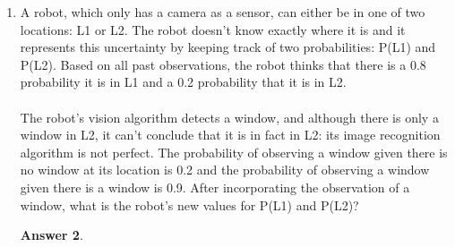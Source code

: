 \documentclass[12pt]{article}
\renewcommand{\(}{\left(}
\renewcommand{\)}{\right)}
\theoremstyle{definition}
\newtheorem*{answer}{Answer}
\begin{document}
\begin{enumerate}
\begin{shaded}
\begin{answer}
    \end{answer}
    \end{shaded}
    \pagebreak
    \textbf{Localization}\\
    In this multi part problem you are going to solve key components for ``Localization'' which is the computer science problem of tracking the location of objects when there is uncertainty.\\
    \item A robot, which only has a camera as a sensor, can either be in one of two locations: L1 or L2. The robot doesn't know exactly where it is and it represents this uncertainty by keeping track of two probabilities: P(L1) and P(L2). Based on all past observations, the robot thinks that there is a 0.8 probability it is in L1 and a 0.2 probability that it is in L2.\\ \\
    The robot's vision algorithm detects a window, and although there is only a window in L2, it can't conclude that it is in fact in L2: its image recognition algorithm is not perfect. The probability of observing a window given there is no window at its location is 0.2 and the probability of observing a window given there is a window is 0.9. After incorporating the observation of a window, what is the robot's new values for P(L1) and P(L2)?
    
    \begin{shaded}
    \begin{answer}
    

\end{answer}
\end{shaded}
\end{enumerate}
\end{document}
